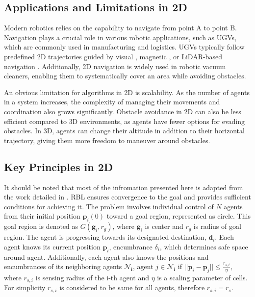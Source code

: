     \subsection{Applications and Limitations in 2D}
        Modern robotics relies on the capability to navigate from point A to point B.
        Navigation plays a crucial role in various robotic applications, such as \ac{UGV}s, which are commonly used in manufacturing and logistics. 
        \ac{UGV}s typically follow predefined \ac{2D} trajectories guided by visual \cite{vision_navigation}, magnetic \cite{magnetic_navigation}, or LiDAR-based navigation \cite{lidar_navigation}. 
        Additionally, \ac{2D} navigation is widely used in robotic vacuum cleaners, enabling them to systematically cover an area while avoiding obstacles.

        An obvious limitation for algorithms in \ac{2D} is scalability. 
        As the number of agents in a system increases, the complexity of managing their movements and coordination also grows significantly.
        Obstacle avoidance in \ac{2D} can also be less efficient compared to \ac{3D} environments, as agents have fewer options for evading obstacles. 
        In \ac{3D}, agents can change their altitude in addition to their horizontal trajectory, giving them more freedom to maneuver around obstacles.

    \subsection{Key Principles in 2D}
        It should be noted that most of the infromation presented here is adapted from the work detailed in \cite{rbl_paper}.
        RBL ensures convergence to the goal and provides sufficient conditions for achieving it. 
        The problem involves individual control of $N$ agents from their initial position $\mathbf{p}_i(0)$ toward a goal region, represented as circle.
        This goal region is denoted as $G(\mathbf{g}_i, r_g)$, where $\mathbf{g}_i$ is center and $r_g$ is radius of goal region. 
        The agent is progressing towards its designated destination, $\mathbf{d}_i$.
        Each agent knows its current position $\mathbf{p}_i$, encumbrance $\delta_i$, which determines safe space around agent.
        Additionally, each agent also knows the positions and encumbrances of its neighboring agents $\mathbf{\mathcal{N}_i}$, agent $j \in \mathbf{\mathcal{N}_i}$ if $||\mathbf{p}_i - \mathbf{p}_j|| \leq \frac{r_{s,i}}{\eta}$, where $r_{s,i}$ is sensing radius of the i-th agent and $\eta$ is a scaling parameter of cells.
        For simplicity $r_{s,i}$ is considered to be same for all agents, therefore $r_{s,i} = r_s$. 

